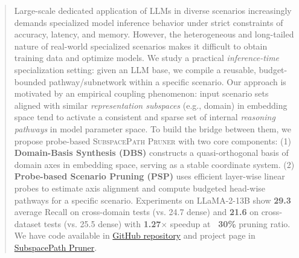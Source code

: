 \documentclass{article}
\theoremstyle{plain}
\theoremstyle{definition}
\theoremstyle{remark}
\begin{document}
\begin{abstract}
\vspace{-2mm}
Large-scale dedicated application of LLMs in diverse scenarios increasingly demands specialized model inference behavior under strict constraints of accuracy, latency, and memory. However, the heterogeneous and long-tailed nature of real-world specialized scenarios makes it difficult to obtain training data and optimize models. 
We study a practical \emph{inference-time} specialization setting: given an LLM base, we compile a reusable, budget-bounded pathway/subnetwork within a specific scenario.
Our approach is motivated by an empirical coupling phenomenon: input scenario sets aligned with similar \emph{representation subspaces} (e.g., domain) in embedding space tend to activate a consistent and sparse set of internal \emph{reasoning pathways} in model parameter space.
To build the bridge between them, we propose probe-based \textsc{SubspacePath Pruner} with two core components:
(1) \textbf{Domain-Basis Synthesis (DBS)} constructs a quasi-orthogonal basis of domain axes in embedding space, serving as a stable coordinate system.
(2) \textbf{Probe-based Scenario Pruning (PSP)} uses efficient layer-wise linear probes to estimate axis alignment and compute budgeted head-wise pathways for a specific scenario.
Experiments on LLaMA-2-13B show \textbf{29.3} average Recall on cross-domain tests (vs. 24.7 dense) and \textbf{21.6} on cross-dataset tests (vs. 25.5 dense) with \textbf{1.27$\times$} speedup at \textbf{~30\%} pruning ratio.
We have code available in \href{https://github.com/GongZhiren/SubspacePathPruner}{GitHub repository} and project page in \href{https://gongzhiren.github.io/SubspacePathPruner-website/}{SubspacePath Pruner}.
\vspace{-2mm}

\end{abstract}









\end{document}
